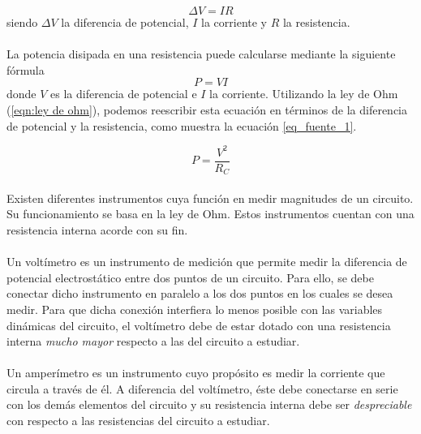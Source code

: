 \begin{equation}\label{eqn:ley de ohm}
    \Delta V=I R
\end{equation}
siendo $\Delta V$ la diferencia de potencial, $I$ la corriente y $R$ la resistencia. 

\paragraph{}
La potencia disipada en una resistencia puede calcularse mediante la siguiente fórmula
\begin{equation}\label{potencia}
    P = V I
\end{equation} 
donde $V$ es la diferencia de potencial e $I$ la corriente. Utilizando la ley de Ohm (\ref{eqn:ley de ohm}), podemos reescribir esta ecuación en términos de la diferencia de potencial y la resistencia, como muestra la ecuación \ref{eq_fuente_1}.

\begin{equation}\label{eq_fuente_1}
    P = \frac{V^2}{R_C}
\end{equation}


\paragraph{}
Existen diferentes instrumentos cuya función en medir magnitudes de un circuito. Su funcionamiento se basa en la ley de Ohm. Estos instrumentos cuentan con una resistencia interna acorde con su fin.

\paragraph{}
Un voltímetro es un instrumento de medición que permite medir la diferencia de potencial electrostático entre dos puntos de un circuito. Para ello, se debe conectar dicho instrumento en paralelo a los dos puntos en los cuales se desea medir. Para que dicha conexión interfiera lo menos posible con las variables dinámicas del circuito, el voltímetro debe de estar dotado con una resistencia interna \textit{mucho mayor} respecto a las del circuito a estudiar.

\paragraph{}
Un amperímetro es un instrumento cuyo propósito es medir la corriente que circula a través de él. A diferencia del voltímetro, éste debe conectarse en serie con los demás elementos del circuito y su resistencia interna debe ser \textit{despreciable} con respecto a las resistencias del circuito a estudiar.

